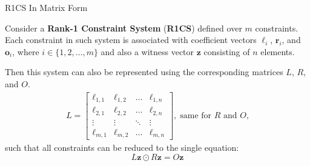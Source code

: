 \documentclass{zkdl-presentation-template}
\begin{document}
    \begin{frame}{R1CS In Matrix Form}
        \begin{theorem} 
            Consider a \textbf{Rank-1 Constraint System} (\textbf{R1CS}) defined over $m$ constraints. Each constraint in such system is
            associated with coefficient vectors $\boldsymbol{\ell}_i$, $\boldsymbol{r}_i$, and $\boldsymbol{o}_i$, where $i \in \{1, 2, \dots, m\}$ and
            also a witness vector $\mathbf{z}$ consisting of $n$ elements.
        
            Then this system can also be represented using the corresponding matrices $L$, $R$, and $O$.
            \begin{align*}
                L = \begin{bmatrix}
                    \ell_{1,1} & \ell_{1,2} & \dots & \ell_{1,n} \\
                    \ell_{2,1} & \ell_{2,2} & \dots & \ell_{2,n} \\
                    \vdots & \vdots & \ddots & \vdots \\
                    \ell_{m,1} & \ell_{m,2} & \dots & \ell_{m,n}
                \end{bmatrix}, \; \text{same for $R$ and $O$,}
            \end{align*}
            such that all constraints can be reduced to the single equation:
            \begin{equation*}
                L\mathbf{z} \odot R\mathbf{z} = O\mathbf{z}
            \end{equation*}
        \end{theorem}
    \end{frame}
\end{document}
